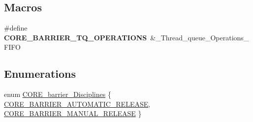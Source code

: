 \subsection*{Macros}
\begin{DoxyCompactItemize}
\item 
\mbox{\label{group__RTEMSScoreBarrier_gab45fa3b254790dacc84c4f9e8031f8f9}} 
\#define {\bfseries C\+O\+R\+E\+\_\+\+B\+A\+R\+R\+I\+E\+R\+\_\+\+T\+Q\+\_\+\+O\+P\+E\+R\+A\+T\+I\+O\+NS}~\&\+\_\+\+Thread\+\_\+queue\+\_\+\+Operations\+\_\+\+F\+I\+FO
\end{DoxyCompactItemize}
\subsection*{Enumerations}
\begin{DoxyCompactItemize}
\item 
enum \mbox{\hyperlink{group__RTEMSScoreBarrier_ga48a30f464f6a44bf727e3958a3c0e822}{C\+O\+R\+E\+\_\+barrier\+\_\+\+Disciplines}} \{ \mbox{\hyperlink{group__RTEMSScoreBarrier_gga48a30f464f6a44bf727e3958a3c0e822a683c23ecc8c115ba990f2e6263556617}{C\+O\+R\+E\+\_\+\+B\+A\+R\+R\+I\+E\+R\+\_\+\+A\+U\+T\+O\+M\+A\+T\+I\+C\+\_\+\+R\+E\+L\+E\+A\+SE}}, 
\mbox{\hyperlink{group__RTEMSScoreBarrier_gga48a30f464f6a44bf727e3958a3c0e822a68ff6cd596bb04bc5b6b9bbbd93046e8}{C\+O\+R\+E\+\_\+\+B\+A\+R\+R\+I\+E\+R\+\_\+\+M\+A\+N\+U\+A\+L\+\_\+\+R\+E\+L\+E\+A\+SE}}
 \}
\end{DoxyCompactItemize}

